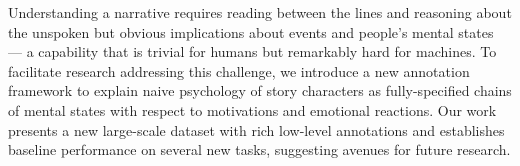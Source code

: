Understanding a narrative requires reading between the lines and reasoning about the unspoken but obvious implications about events and people's mental states — a capability that is trivial for humans but remarkably hard for machines. To facilitate research addressing this challenge, we introduce a new annotation framework to explain naive psychology of story characters as fully-specified chains of mental states with respect to motivations and emotional reactions. Our work presents a new large-scale dataset with rich low-level annotations and establishes baseline performance on several new tasks, suggesting avenues for future research.
